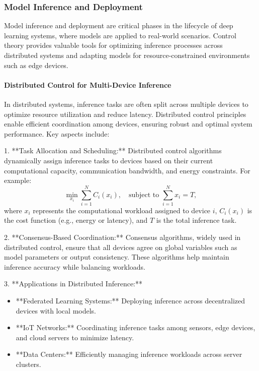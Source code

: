 \documentclass{IEEEojcsys}
\begin{document}
\subsubsection{Model Inference and Deployment}
Model inference and deployment are critical phases in the lifecycle of deep learning systems, where models are applied to real-world scenarios. Control theory provides valuable tools for optimizing inference processes across distributed systems and adapting models for resource-constrained environments such as edge devices.

\paragraph{Distributed Control for Multi-Device Inference}
In distributed systems, inference tasks are often split across multiple devices to optimize resource utilization and reduce latency. Distributed control principles enable efficient coordination among devices, ensuring robust and optimal system performance. Key aspects include:

1. **Task Allocation and Scheduling:**
   Distributed control algorithms dynamically assign inference tasks to devices based on their current computational capacity, communication bandwidth, and energy constraints. For example:
   \[
   \min_{x_i} \sum_{i=1}^N C_i(x_i), \quad \text{subject to } \sum_{i=1}^N x_i = T,
   \]
   where $x_i$ represents the computational workload assigned to device $i$, $C_i(x_i)$ is the cost function (e.g., energy or latency), and $T$ is the total inference task.

2. **Consensus-Based Coordination:**
   Consensus algorithms, widely used in distributed control, ensure that all devices agree on global variables such as model parameters or output consistency. These algorithms help maintain inference accuracy while balancing workloads.

3. **Applications in Distributed Inference:**
   \begin{itemize}
       \item **Federated Learning Systems:** Deploying inference across decentralized devices with local models.
       \item **IoT Networks:** Coordinating inference tasks among sensors, edge devices, and cloud servers to minimize latency.
       \item **Data Centers:** Efficiently managing inference workloads across server clusters.
   \end{itemize}
\end{document}
